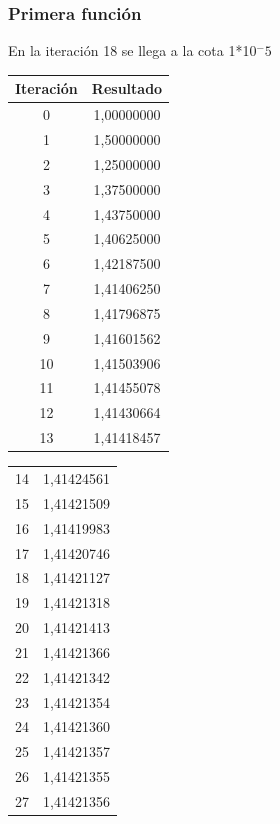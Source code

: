 \documentclass[titlepage,a4paper]{article}
\begin{document}
\subsubsection{Primera función}\label{sec:bis1}

En la iteración 18 se llega a la cota 1*10$^-5$

\begin{multicols}{2}
\begin{center}
\begin{tabular}{| c | c |}
\hline
        Iteración & Resultado \\ \hline
        0     & 1,00000000 \\
        1     & 1,50000000 \\
        2     & 1,25000000 \\
        3     & 1,37500000 \\
        4     & 1,43750000 \\
        5     & 1,40625000 \\
        6     & 1,42187500 \\
        7     & 1,41406250 \\
        8     & 1,41796875 \\
        9     & 1,41601562 \\
        10    & 1,41503906 \\
        11    & 1,41455078 \\
        12    & 1,41430664 \\
        13    & 1,41418457 \\
\end{tabular}
\end{center}

\begin{center}
\begin{tabular}{| c | c |}
\hline   
 
        14    & 1,41424561 \\
        15    & 1,41421509 \\
        16    & 1,41419983 \\
        17    & 1,41420746 \\
        18    & 1,41421127 \\
        19    & 1,41421318 \\
        20    & 1,41421413 \\
        21    & 1,41421366 \\
        22    & 1,41421342 \\
        23    & 1,41421354 \\
        24    & 1,41421360 \\
        25    & 1,41421357 \\
        26    & 1,41421355 \\
        27    & 1,41421356 \\ 
        \hline
    \end{tabular}
\end{center}
\end{multicols}
\end{document}
